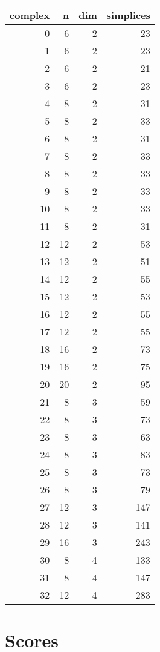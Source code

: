 \documentclass{article}
\begin{document}
\begin{tabular}{rrrr}
\toprule
complex & n & dim & simplices \\
\midrule
0 & 6 & 2 & 23 \\
1 & 6 & 2 & 23 \\
2 & 6 & 2 & 21 \\
3 & 6 & 2 & 23 \\
4 & 8 & 2 & 31 \\
5 & 8 & 2 & 33 \\
6 & 8 & 2 & 31 \\
7 & 8 & 2 & 33 \\
8 & 8 & 2 & 33 \\
9 & 8 & 2 & 33 \\
10 & 8 & 2 & 33 \\
11 & 8 & 2 & 31 \\
12 & 12 & 2 & 53 \\
13 & 12 & 2 & 51 \\
14 & 12 & 2 & 55 \\
15 & 12 & 2 & 53 \\
16 & 12 & 2 & 55 \\
17 & 12 & 2 & 55 \\
18 & 16 & 2 & 73 \\
19 & 16 & 2 & 75 \\
20 & 20 & 2 & 95 \\
21 & 8 & 3 & 59 \\
22 & 8 & 3 & 73 \\
23 & 8 & 3 & 63 \\
24 & 8 & 3 & 83 \\
25 & 8 & 3 & 73 \\
26 & 8 & 3 & 79 \\
27 & 12 & 3 & 147 \\
28 & 12 & 3 & 141 \\
29 & 16 & 3 & 243 \\
30 & 8 & 4 & 133 \\
31 & 8 & 4 & 147 \\
32 & 12 & 4 & 283 \\
\bottomrule
\end{tabular}



\section{Scores}
\end{document}
